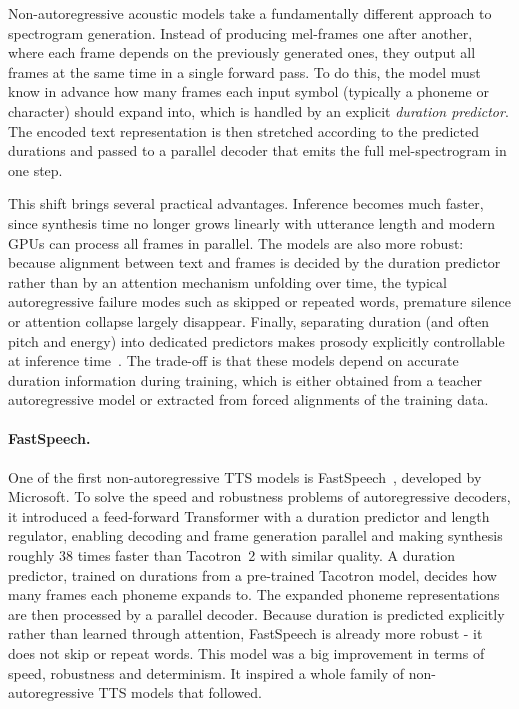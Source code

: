 \documentclass[
         english, %
    monochrome, %
]{VUMIFSEMasterThesis}
\begin{document}

Non-autoregressive acoustic models take a fundamentally different approach to spectrogram generation.
Instead of producing mel-frames one after another, where each frame depends on the previously generated ones, they output all frames at the same time in a single forward pass.
To do this, the model must know in advance how many frames each input symbol (typically a phoneme or character) should expand into, which is handled by an explicit \emph{duration predictor}.
The encoded text representation is then stretched according to the predicted durations and passed to a parallel decoder that emits the full mel-spectrogram in one step.

This shift brings several practical advantages.
Inference becomes much faster, since synthesis time no longer grows linearly with utterance length and modern GPUs can process all frames in parallel.
The models are also more robust: because alignment between text and frames is decided by the duration predictor rather than by an attention mechanism unfolding over time, the typical autoregressive failure modes such as skipped or repeated words, premature silence or attention collapse largely disappear.
Finally, separating duration (and often pitch and energy) into dedicated predictors makes prosody explicitly controllable at inference time~\cite{kim2021conditional}.
The trade-off is that these models depend on accurate duration information during training, which is either obtained from a teacher autoregressive model or extracted from forced alignments of the training data.

\paragraph{FastSpeech.}
One of the first non-autoregressive TTS models is FastSpeech~\cite{ren2019fastspeech}, developed by Microsoft.
To solve the speed and robustness problems of autoregressive decoders, it introduced a feed-forward Transformer with a duration predictor and length regulator, enabling decoding and frame generation parallel and making synthesis roughly 38 times faster than Tacotron~2 with similar quality.
A duration predictor, trained on durations from a pre-trained Tacotron model, decides how many frames each phoneme expands to.
The expanded phoneme representations are then processed by a parallel decoder.
Because duration is predicted explicitly rather than learned through attention, FastSpeech is already more robust - it does not skip or repeat words.
This model was a big improvement in terms of speed, robustness and determinism.
It inspired a whole family of non-autoregressive TTS models that followed.
\end{document}
